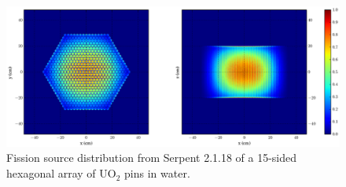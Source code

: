 \begin{figure}[h!] 
  \centering
    \includegraphics[width=\textwidth,trim= 4cm 0cm 6cm 0cm]{graphics/finalresults/assembly_fiss_serp-6.eps}
     \caption{Fission source distribution from Serpent 2.1.18 of a 15-sided hexagonal array of UO$_2$ pins in water. \label{serp_assembly_mesh} }
\end{figure}

